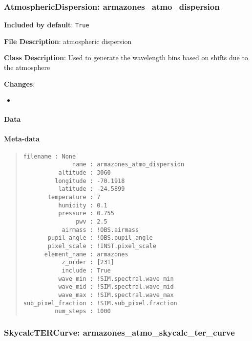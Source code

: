 \subsubsection{AtmosphericDispersion: \textquotedbl{}armazones\_atmo\_dispersion\textquotedbl{}%
  \label{atmosphericdispersion-armazones-atmo-dispersion}%
}

\textbf{Included by default}: \texttt{True}

\textbf{File Description}: atmospheric dispersion

\textbf{Class Description}: Used to generate the wavelength bins based on shifts due to the atmosphere

\textbf{Changes}:

\begin{itemize}
\item \end{itemize}


\paragraph{Data%
  \label{id1}%
}


\paragraph{Meta-data%
  \label{id2}%
}

\begin{quote}
\begin{alltt}
\begin{lstlisting}[frame=single]
          filename : None
              name : armazones_atmo_dispersion
          altitude : 3060
         longitude : -70.1918
          latitude : -24.5899
       temperature : 7
          humidity : 0.1
          pressure : 0.755
               pwv : 2.5
           airmass : !OBS.airmass
       pupil_angle : !OBS.pupil_angle
       pixel_scale : !INST.pixel_scale
      element_name : armazones
           z_order : [231]
           include : True
          wave_min : !SIM.spectral.wave_min
          wave_mid : !SIM.spectral.wave_mid
          wave_max : !SIM.spectral.wave_max
sub_pixel_fraction : !SIM.sub_pixel.fraction
         num_steps : 1000
\end{lstlisting}
\end{alltt}
\end{quote}


\subsubsection{SkycalcTERCurve: \textquotedbl{}armazones\_atmo\_skycalc\_ter\_curve\textquotedbl{}%
  \label{skycalctercurve-armazones-atmo-skycalc-ter-curve}%
}

